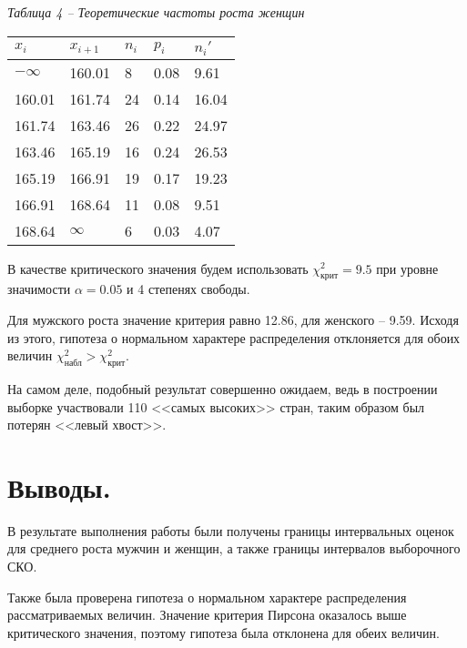 \pagebreak

\noindent\textit{Таблица 4 -- Теоретические частоты роста женщин}
\begin{longtable}{|p{3cm}|p{3cm}|p{3cm}|p{3cm}|p{3cm}|}
    \hline
    $x_i$ & $x_{i+1}$ & $n_i$ & $p_i$ & $n_i'$ \\\hline
    $-\infty$ & 160.01 & 8 & 0.08 & 9.61 \\\hline
    160.01 & 161.74 & 24 & 0.14 & 16.04 \\\hline
    161.74 & 163.46 & 26 & 0.22 & 24.97 \\\hline
    163.46 & 165.19 & 16 & 0.24 & 26.53 \\\hline
    165.19 & 166.91 & 19 & 0.17 & 19.23 \\\hline
    166.91 & 168.64 & 11 & 0.08 & 9.51 \\\hline
    168.64 & $\infty$ & 6 & 0.03 & 4.07 \\\hline
\end{longtable}

В качестве критического значения будем использовать $\chi^2_\text{крит}=9.5$ при
уровне значимости $\alpha = 0.05$ и 4 степенях свободы.

Для мужского роста значение критерия равно 12.86, для женского -- 9.59.
Исходя из этого, гипотеза о нормальном характере распределения отклоняется для обоих величин $\chi^2_\text{набл} > \chi^2_\text{крит}$.

На самом деле, подобный результат совершенно ожидаем, ведь в построении выборке участвовали
110 <<самых высоких>> стран, таким образом был потерян <<левый хвост>>.

\section*{Выводы.}
В результате выполнения работы были получены границы интервальных оценок
для среднего роста мужчин и женщин, а также границы интервалов выборочного СКО.

Также была проверена гипотеза о нормальном характере распределения
рассматриваемых величин.
Значение критерия Пирсона оказалось выше критического значения, поэтому
гипотеза была отклонена для обеих величин.